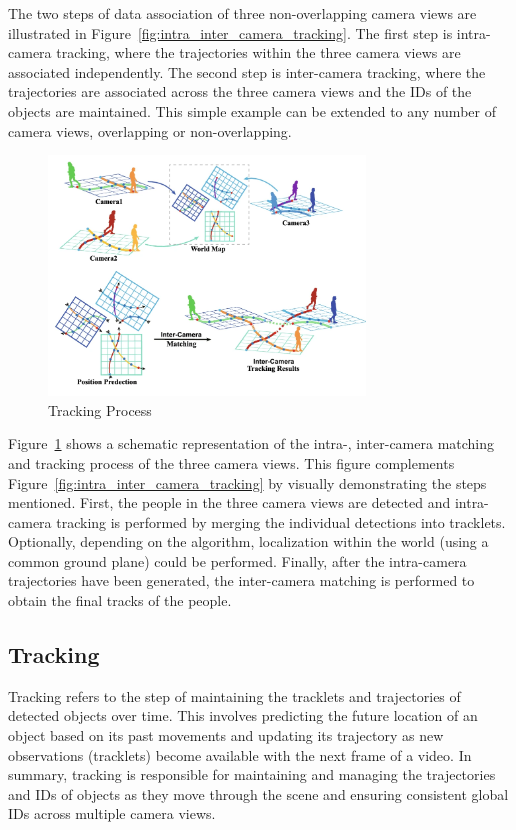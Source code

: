 The two steps of data association of three non-overlapping camera views are illustrated in Figure~\ref{fig:intra_inter_camera_tracking}. The first step is intra-camera tracking, where the trajectories within the three camera views are associated independently. The second step is inter-camera tracking, where the trajectories are associated across the three camera views and the IDs of the objects are maintained. This simple example can be extended to any number of camera views, overlapping or non-overlapping.

\begin{figure}[ht]
    \centering
    \includegraphics[width=0.75\textwidth]{resources/fig/Ma21-tracking_process.png}
    \caption[Tracking Process]{Tracking Process~\cite[source image:][Fig.~1]{Ma21}}\label{fig:projection}
\end{figure}

Figure~\ref{fig:projection} shows a schematic representation of the intra-, inter-camera matching and tracking process of the three camera views. This figure complements Figure~\ref{fig:intra_inter_camera_tracking} by visually demonstrating the steps mentioned. First, the people in the three camera views are detected and intra-camera tracking is performed by merging the individual detections into tracklets. Optionally, depending on the algorithm, localization within the world (using a common ground plane) could be performed. Finally, after the intra-camera trajectories have been generated, the inter-camera matching is performed to obtain the final tracks of the people.

\subsection{Tracking}\label{subsec:tracking}
Tracking refers to the step of maintaining the tracklets and trajectories of detected objects over time. This involves predicting the future location of an object based on its past movements and updating its trajectory as new observations (tracklets) become available with the next frame of a video. In summary, tracking is responsible for maintaining and managing the trajectories and IDs of objects as they move through the scene and ensuring consistent global IDs across multiple camera views.

